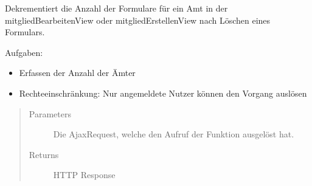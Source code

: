 \documentclass[letterpaper,10pt,english]{sphinxmanual}
\begin{document}
\begin{fulllineitems}
\label{\detokenize{masterCodeDoc:mitglieder.views.funktion_loeschen}}
Dekrementiert die Anzahl der Formulare für ein Amt in der mitgliedBearbeitenView oder mitgliedErstellenView nach Löschen eines Formulars.

Aufgaben:
\begin{itemize}
\item {} 
Erfassen der Anzahl der Ämter

\item {} 
Rechteeinschränkung: Nur angemeldete Nutzer können den Vorgang auslösen

\end{itemize}
\begin{quote}\begin{description}
\item[{Parameters}] \leavevmode
{} \textendash{} Die Ajax\sphinxhyphen{}Request, welche den Aufruf der Funktion ausgelöst hat.

\item[{Returns}] \leavevmode
HTTP Response

\end{description}\end{quote}

\end{fulllineitems}

\end{document}
